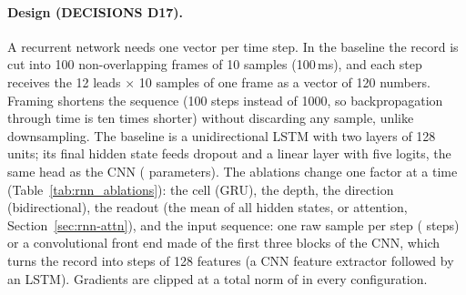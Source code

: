 \paragraph{Design (DECISIONS D17).} A recurrent network needs one vector per time step. In the baseline
the record is cut into 100 non-overlapping frames of 10 samples (100\,ms), and each step receives the
12 leads $\times$ 10 samples of one frame as a vector of 120 numbers. Framing shortens the sequence
(100 steps instead of 1000, so backpropagation through time is ten times shorter) without discarding any
sample, unlike downsampling. The baseline is a unidirectional LSTM with two layers of 128 units; its
final hidden state feeds dropout and a linear layer with five logits, the same head as the CNN
(\rnnParamsBase{} parameters). The ablations change one factor at a time (Table~\ref{tab:rnn_ablations}):
the cell (GRU), the depth, the direction (bidirectional), the readout (the mean of all hidden states, or
attention, Section~\ref{sec:rnn-attn}), and the input sequence: one raw sample per step
(\rnnStepsRaw{} steps) or a convolutional front end made of the first three blocks of the CNN, which
turns the record into \rnnStepsConv{} steps of 128 features (a CNN feature extractor followed by an
LSTM). Gradients are clipped at a total norm of \rnnGradClip{} in every configuration.




